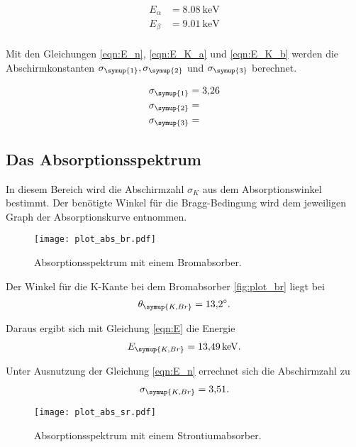 \begin{align*}
  E_\alpha &= \SI{8.08}{\kilo\eV}\\
  E_\beta &= \SI{9.01}{\kilo\eV}\\
\end{align*}

Mit den Gleichungen \eqref{eqn:E_n}, \eqref{eqn:E_K_a} und
\eqref{eqn:E_K_b} werden die Abschirmkonstanten $\sigma_\symup{1}, \sigma_\symup{2}$ und
$\sigma_\symup{3}$ berechnet.

\begin{align*}
  \sigma_\symup{1} &= \num{3.26} \\
  \sigma_\symup{2} &= \num{} \\
  \sigma_\symup{3} &= \num{}
\end{align*}

\subsection{Das Absorptionsspektrum}

In diesem Bereich wird die Abschirmzahl $\sigma_K$ aus dem Absorptionswinkel bestimmt.
Der benötigte Winkel für die Bragg-Bedingung wird dem jeweiligen Graph der Absorptionskurve
entnommen. \\

\begin{figure}[H]
  \centering
  \texttt{[image: plot\_abs\_br.pdf]}
  \caption{Absorptionsspektrum mit einem Bromabsorber.}
  \label{fig:plot_br}
\end{figure}

Der Winkel für die K-Kante bei dem Bromabsorber \eqref{fig:plot_br} liegt bei
\begin{align*}
  \theta_\symup{K,Br} = \SI{13.2}{\degree}.
\end{align*}

Daraus ergibt sich mit Gleichung \eqref{eqn:E} die Energie
\begin{align*}
  E_\symup{K,Br} = \SI{13.49}{\kilo\eV}.
\end{align*}

Unter Ausnutzung der Gleichung \eqref{eqn:E_n} errechnet sich die Abschirmzahl zu
\begin{align*}
  \sigma_\symup{K,Br} = \num{3.51} .
\end{align*}

\begin{figure}[H]
  \centering
  \texttt{[image: plot\_abs\_sr.pdf]}
  \caption{Absorptionsspektrum mit einem Strontiumabsorber.}
  \label{fig:plot_sr}
\end{figure}

